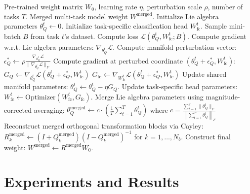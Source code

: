 \documentclass{article}
\theoremstyle{plain}
\theoremstyle{definition}
\theoremstyle{remark}
\begin{document}
\begin{algorithm}[!t]
\caption{Decoupled Sharpness-Aware Manifold Merging (D-SMM)}
\label{alg:dsmm}
\begin{algorithmic}[1]
 Pre-trained weight matrix $W_0$, learning rate $\eta$, perturbation scale $\rho$, number of tasks $T$.
 Merged multi-task model weight $W^{\text{merged}}$.
    \STATE Initialize Lie algebra parameters $\theta^t_Q \leftarrow 0$.
    \STATE Initialize task-specific classification head $W^t_{\text{fc}}$.
        \STATE Sample mini-batch $B$ from task $t$'s dataset.
        \STATE Compute loss $\mathcal{L}(\theta^t_Q, W^t_{\text{fc}}; B)$.
        \STATE Compute gradient w.r.t. Lie algebra parameters: $\nabla_{\theta^t_Q} \mathcal{L}$.
        \STATE Compute manifold perturbation vector:
        \STATE \quad $\epsilon^*_Q \leftarrow \rho \frac{\nabla_{\theta^t_Q} \mathcal{L}}{\|\nabla_{\theta^t_Q} \mathcal{L}\|_F}$
        \STATE Compute gradient at perturbed coordinate $(\theta^t_Q + \epsilon^*_Q, W^t_{\text{fc}})$:
        \STATE \quad $G_Q \leftarrow \nabla_{\theta^t_Q} \mathcal{L}(\theta^t_Q + \epsilon^*_Q, W^t_{\text{fc}})$
        \STATE \quad $G_{\text{fc}} \leftarrow \nabla_{W^t_{\text{fc}}} \mathcal{L}(\theta^t_Q + \epsilon^*_Q, W^t_{\text{fc}})$
        \STATE Update shared manifold parameters: $\theta^t_Q \leftarrow \theta^t_Q - \eta G_Q$.
        \STATE Update task-specific head parameters: $W^t_{\text{fc}} \leftarrow \text{Optimizer}(W^t_{\text{fc}}, G_{\text{fc}})$.
    \ENDWHILE
\ENDFOR
\STATE Merge Lie algebra parameters using magnitude-corrected averaging:
\STATE \quad $\theta^{\text{merged}}_Q \leftarrow c \cdot \left(\frac{1}{T} \sum_{t=1}^T \theta^t_Q\right)$ where $c = \frac{\sum_{t=1}^T \|\theta^t_Q\|_F}{\left\|\sum_{t=1}^T \theta^t_Q\right\|_F}$
\STATE Reconstruct merged orthogonal transformation blocks via Cayley:
\STATE \quad $R^{\text{merged}}_k \leftarrow (I + Q^{\text{merged}}_k)(I - Q^{\text{merged}}_k)^{-1}$ for $k = 1, \dots, N_b$.
\STATE Construct final weight: $W^{\text{merged}} \leftarrow R^{\text{merged}} W_0$.
\end{algorithmic}
\end{algorithm}

\section{Experiments and Results}
\label{sec:experiments}
\end{document}
